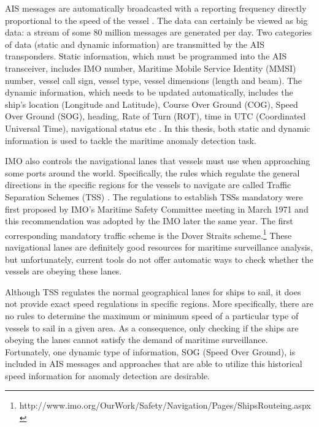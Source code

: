 \documentclass[12pt,glossary]{dalcsthesis}
\begin{document}
AIS messages are automatically broadcasted with a reporting frequency directly proportional to the speed of the vessel \cite{kde}.  The data can certainly be viewed as big data: a stream of some 80 million messages are generated per day. Two categories of data (static and dynamic information) are transmitted by the AIS transponders. Static information, which must be programmed into the AIS transceiver,  includes IMO number, Maritime Mobile Service Identity (MMSI) number, vessel call sign, vessel type, vessel dimensions (length and beam). The dynamic information, which needs to be updated automatically, includes the ship's location (Longitude and Latitude), Course Over Ground (COG), Speed Over Ground (SOG), heading, Rate of Turn (ROT), time in UTC (Coordinated Universal Time), navigational status etc \cite{IALA}. In this thesis, both static and dynamic information is used to tackle the maritime anomaly detection task.


IMO also controls the navigational lanes that vessels must use when approaching some ports around the world. Specifically, the rules which regulate the general directions in the specific regions for the vessels to navigate are called Traffic Separation Schemes (TSS) \cite{tss}.  The regulations to establish TSSs mandatory were first proposed by IMO's Maritime Safety Committee meeting in March 1971 and this recommendation was adopted by the IMO later the same year. The first corresponding mandatory traffic scheme is the Dover Straits scheme.\footnote{http://www.imo.org/OurWork/Safety/Navigation/Pages/ShipsRouteing.aspx} These navigational lanes are definitely good resources for maritime surveillance analysis, but unfortunately, current tools do not offer automatic ways to check whether the vessels are obeying these lanes. 

Although TSS regulates the normal geographical lanes for ships to sail, it does not provide exact speed regulations in specific regions. More specifically, there are no rules to determine the maximum or minimum speed of a particular type of vessels to sail in a given area. As a consequence, only checking if the ships are obeying the lanes cannot satisfy the demand of maritime surveillance. Fortunately, one dynamic type of information, SOG (Speed Over Ground), is included in AIS messages and approaches that are able to utilize this historical speed information for anomaly detection are desirable.

\end{document}
